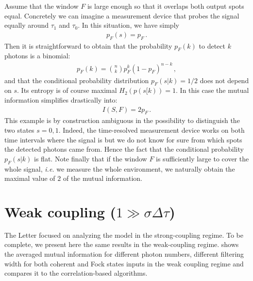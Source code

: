 \begin{example}
Assume that the window $F$ is large enough so that it overlaps both output
spots equal. Concretely we can imagine a measurement device that probes the
signal equally around $\tau_1$ and $\tau_0$. In this situation, we have simply
%
\begin{align}
p_F(s) = p_F
\,.
\end{align}
Then it is straightforward to obtain that the probability $p_F(k)$ to 
detect $k$ photons is a binomial:
%
\begin{align}
p_F(k) = \binom{n}{k}p_F^k(1-p_F)^{n-k}
\,,
\end{align}
and that the conditional probability distribution $p_F(s|k) = 1/2$ does
not depend on $s$. Its entropy is of course maximal 
$H_2(p(s[k)) = 1$. In this case the mutual information simplifies
drastically into:
%
\begin{align}
I(S,F) = 2p_F
\,.
\end{align}
This example is by construction ambiguous in the possibility to 
distinguish the two states $s=0,1$. Indeed, the time-resolved measurement
device works on both time intervals where the signal is but we do not
know for sure from which spots the detected photons came from. Hence
the fact that the conditional probability $p_F(s|k)$ is flat. Note finally that
if the window $F$ is sufficiently large to cover the whole signal, \textit{i.e.} we measure
the whole environment, we naturally obtain the maximal value of $2$ of the
mutual information.
\end{example}

\section{Weak coupling ($1 \gg \sigma \Delta\tau$)}
\label{sec/weak-coupling}

The Letter focused on analyzing the model in the
strong-coupling regime. To be complete, we present here
the same results in the weak-coupling regime.
 shows 
the averaged mutual information for different photon numbers,
different filtering width for both coherent and Fock states inputs
in the weak coupling regime and compares it to the correlation-based
algorithms. 

